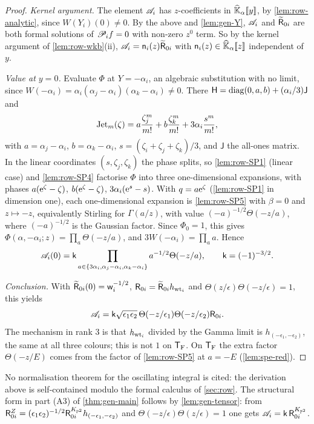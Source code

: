 \begin{proof}
\emph{Kernel argument.} The element $\mathscr{A}_i$ has $z$-coefficients in $\widehat{\mathbb{K}}_{\alpha}[\![ y ]\!]$, by \cref{lem:row-analytic}, since $W(Y_i)(0)\neq0$. By the above and \cref{lem:gen-Y}, $\mathscr{A}_i$ and $\widetilde{\mathsf{R}}_{0i}$ are both formal solutions of $\mathscr{P}_if=0$ with non-zero $z^0$ term. So by the kernel argument of \cref{lem:row-wkb}(ii), $\mathscr{A}_i=\mathsf{n}_i(z)\widetilde{\mathsf{R}}_{0i}$ with $\mathsf{n}_i(z)\in\widehat{\mathbb{K}}_{\alpha}[\![ z ]\!]$ independent of $y$.

\emph{Value at $y=0$.} Evaluate $\Phi$ at $Y=-\alpha_i$, an algebraic substitution with no limit, since $W(-\alpha_i)=\alpha_i(\alpha_j-\alpha_i)(\alpha_k-\alpha_i)\neq0$. There $\mathsf{H}=\mathrm{diag}(0,a,b)+(\alpha_i/3)\mathsf{J}$ and
\[
\mathrm{Jet}_m(\zeta)=a\frac{\zeta_j^m}{m!}+b\frac{\zeta_k^m}{m!}+3\alpha_i\frac{s^m}{m!},
\]
with $a=\alpha_j-\alpha_i$, $b=\alpha_k-\alpha_i$, $s=(\zeta_i+\zeta_j+\zeta_k)/3$, and $\mathsf{J}$ the all-ones matrix. In the linear coordinates $(s,\zeta_j,\zeta_k)$ the phase splits, so \cref{lem:row-SP1} (linear case) and \cref{lem:row-SP4} factorise $\Phi$ into three one-dimensional expansions, with phases $a(\mathrm{e}^{\zeta}-\zeta)$, $b(\mathrm{e}^{\zeta}-\zeta)$, $3\alpha_i(\mathrm{e}^{s}-s)$. With $q=a\mathrm{e}^{\zeta}$ (\cref{lem:row-SP1} in dimension one), each one-dimensional expansion is \cref{lem:row-SP5} with $\beta=0$ and $z\mapsto-z$, equivalently Stirling for $\Gamma(a/z)$, with value $(-a)^{-1/2}\Theta(-z/a)$, where $(-a)^{-1/2}$ is the Gaussian factor. Since $\Phi_0=1$, this gives $\Phi(\alpha,-\alpha_i;z)=\prod_a\Theta(-z/a)$, and $3W(-\alpha_i)=\prod_a a$. Hence
\[
\mathscr{A}_i(0)=\mathsf{k}\prod_{a\in\{3\alpha_i,\alpha_j-\alpha_i,\alpha_k-\alpha_i\}}a^{-1/2}\Theta(-z/a),\qquad\mathsf{k}=(-1)^{-3/2}.
\]

\emph{Conclusion.} With $\widetilde{\mathsf{R}}_{0i}(0)=\mathsf{w}_i^{-1/2}$, $\mathsf{R}_{0i}=\widetilde{\mathsf{R}}_{0i}h_{\mathrm{wt}_i}$ and $\Theta(z/\epsilon)\Theta(-z/\epsilon)=1$, this yields
\[
\mathscr{A}_i=\mathsf{k}\sqrt{\epsilon_1\epsilon_2}\,\Theta(-z/\epsilon_1)\Theta(-z/\epsilon_2)\mathsf{R}_{0i}.
\]
The mechanism in rank $3$ is that $h_{\mathrm{wt}_i}$ divided by the Gamma limit is $h_{(-\epsilon_1,-\epsilon_2)}$, the same at all three colours; this is not $1$ on $\mathsf{T}_{\mathrm{F}}$. On $\mathsf{T}_{\mathrm{F}}$ the extra factor $\Theta(-z/E)$ comes from the factor of \cref{lem:row-SP5} at $a=-E$ (\cref{lem:spe-red}).
\end{proof}

\begin{rmk}
No normalisation theorem for the oscillating integral is cited: the derivation above is self-contained modulo the formal calculus of \cref{sec:row}. The structural form in part (A3) of \cref{thm:gen-main} follows by \cref{lem:gen-tensor}: from $\mathsf{R}^{Z}_{0i}=(\epsilon_1\epsilon_2)^{-1/2}\mathsf{R}^{K_{\mathbb{P}^2}}_{0i}h_{(-\epsilon_1,-\epsilon_2)}$ and $\Theta(-z/\epsilon)\Theta(z/\epsilon)=1$ one gets $\mathscr{A}_i=\mathsf{k}\,\mathsf{R}^{K_{\mathbb{P}^2}}_{0i}$.
\end{rmk}

